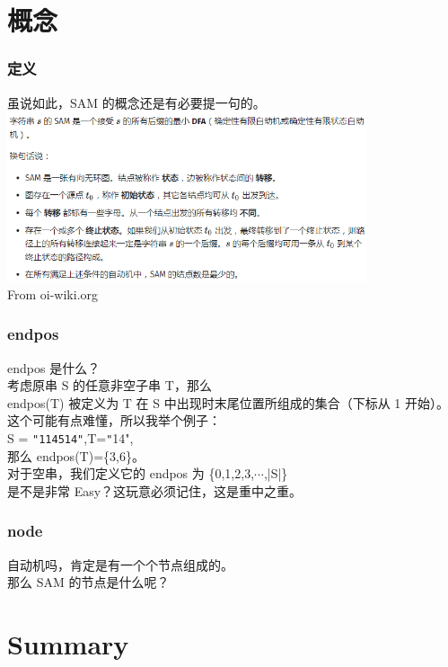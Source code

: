 \documentclass{beamer}
\begin{document}
    \section*{概念}

    \begin{frame}
        \frametitle{定义}
        虽说如此，SAM 的概念还是有必要提一句的。  \\
        \includegraphics[height=5cm]{g2.png} \\
        From oi-wiki.org

    \end{frame}

    \begin{frame}
        \frametitle{endpos}
        endpos 是什么？\\
        考虑原串 S 的任意非空子串 T，那么\\
        endpos(T) 被定义为 T 在 S 中出现时末尾位置所组成的集合（下标从 1 开始）。\\
        这个可能有点难懂，所以我举个例子：\\
        S = \texttt{"114514"}\textnormal,T=\texttt"14",\\
        那么 endpos(T)=\{3,6\}。\\
        对于空串，我们定义它的 endpos 为 \{0,1,2,3,$\cdots$,|S|\}\\
        是不是非常 Easy？这玩意必须记住，这是重中之重。
    \end{frame}

    \begin{frame}
        \frametitle{node}
        自动机吗，肯定是有一个个节点组成的。\\
        那么 SAM 的节点是什么呢？\\

    \end{frame}

    \section*{Summary}
\end{document}
